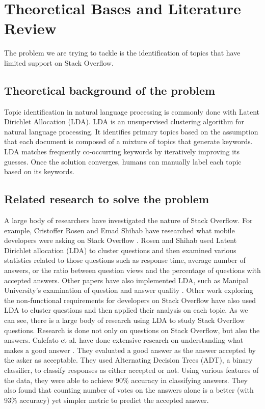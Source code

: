\section{Theoretical Bases and Literature Review}


The problem we are trying to tackle is the identification of topics that have limited support on Stack Overflow.

\subsection{Theoretical background of the problem}
Topic identification in natural language processing is commonly done with Latent Dirichlet Allocation (LDA). LDA is an unsupervised clustering algorithm for natural language processing. It identifies primary topics based on the assumption that each document is composed of a mixture of topics that generate keywords. LDA matches frequently co-occurring keywords by iteratively improving its guesses. Once the solution converges, humans can manually label each topic based on its keywords. 
\subsection{Related research to solve the problem}
A large body of researchers have investigated the nature of Stack Overflow. For example, Cristoffer Rosen and Emad Shihab have researched what mobile developers were asking on Stack Overflow \cite{N1_Paper}. Rosen and Shihab used Latent Dirichlet allocation (LDA) to cluster questions and then examined various statistics related to those questions such as response time, average number of answers, or the ratio between question views and the percentage of questions with accepted answers. Other papers have also implemented LDA, such as Manipal University’s examination of question and answer quality \cite{N2_Paper}. Other work exploring the non-functional requirements for developers on Stack Overflow have also used LDA to cluster questions and then applied their analysis on each topic. As we can see, there is a large body of research using LDA to study Stack Overflow questions.
Research is done not only on questions on Stack Overflow, but also the answers. Calefato et al. have done extensive research on understanding what makes a good answer \cite{N3_Paper}. They evaluated a good answer as the answer accepted by the asker as acceptable. They used Alternating Decision Trees (ADT), a binary classifier, to classify responses as either accepted or not. Using various features of the data, they were able to achieve 90\% accuracy in classifying answers. They also found that counting number of votes on the answers alone is a better (with 93\% accuracy) yet simpler metric to predict the accepted answer.
